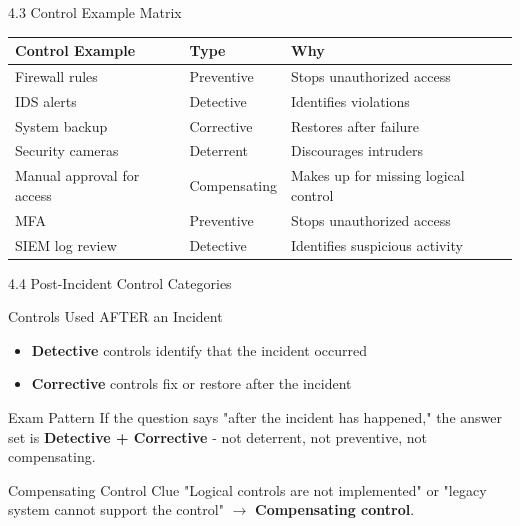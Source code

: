 \documentclass{beamer}
\begin{document}
	\begin{frame}{4.3 Control Example Matrix}
		\begin{table}
			\centering
			\begin{tabular}{|p{3cm}|p{4cm}|p{4cm}|}
				\hline
				\textbf{Control Example} & \textbf{Type} & \textbf{Why} \\
				\hline
				Firewall rules & Preventive & Stops unauthorized access \\
				\hline
				IDS alerts & Detective & Identifies violations \\
				\hline
				System backup & Corrective & Restores after failure \\
				\hline
				Security cameras & Deterrent & Discourages intruders \\
				\hline
				Manual approval for access & Compensating & Makes up for missing logical control \\
				\hline
				MFA & Preventive & Stops unauthorized access \\
				\hline
				SIEM log review & Detective & Identifies suspicious activity \\
			\end{tabular}
		\end{table}
	\end{frame}
	
	\begin{frame}{4.4 Post-Incident Control Categories}
		\begin{block}{Controls Used AFTER an Incident}
			\begin{itemize}
				\item \textbf{Detective} controls identify that the incident occurred
				\item \textbf{Corrective} controls fix or restore after the incident
			\end{itemize}
		\end{block}
		
		\begin{alertblock}{Exam Pattern}
			If the question says "after the incident has happened," the answer set is \textbf{Detective + Corrective} - not deterrent, not preventive, not compensating.
		\end{alertblock}
		
		\begin{exampleblock}{Compensating Control Clue}
			"Logical controls are not implemented" or "legacy system cannot support the control" $\rightarrow$ \textbf{Compensating control}.
		\end{exampleblock}
	\end{frame}
	
\end{document}
